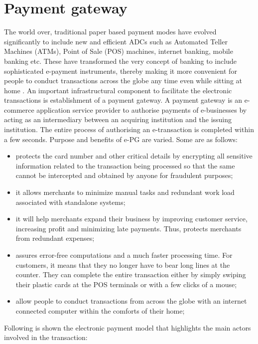 \section{Payment gateway}
\label{sec:payment_gateway}
The world over, traditional paper based payment modes have evolved significantly to include new and efficient ADCs such as Automated Teller Machines (ATMs), Point of Sale (POS) machines, internet banking, mobile banking etc. These have transformed the very concept of banking to include sophisticated e-payment instruments, thereby making it more convenient for people to conduct transactions across the globe any time even while sitting at home \cite{payment_gateway_a}.
\newline
An important infrastructural component to facilitate the electronic transactions is establishment of a payment gateway. A payment gateway is an e-commerce application service provider to authorise payments of e-businesses by acting as an intermediary between an acquiring institution and the issuing institution. The entire process of authorising an e-transaction is completed within a few seconds.
\newline
Purpose and benefits of e-PG are varied. Some are as follows:
\begin{itemize}
\item protects the card number and other critical details by encrypting all sensitive information related to the transaction being processed so that the same cannot be intercepted and obtained by anyone for fraudulent purposes;
\item it allows merchants to minimize manual tasks and redundant work load associated with standalone systems;
\item it will help merchants expand their business by improving customer service, increasing profit and minimizing late payments. Thus, protects merchants from redundant expenses;
\item assures error-free computations and a much faster processing time. For customers, it means that they no longer have to bear long lines at the counter. They can complete the entire transaction either by simply swiping their plastic cards at the POS terminals or with a few clicks of a mouse;
\item allow people to conduct transactions from across the globe with an internet connected computer within the comforts of their home;
\end{itemize}
Following is shown the electronic payment model \cite{payment_gateway_model} that highlights the main actors involved in the transaction:
